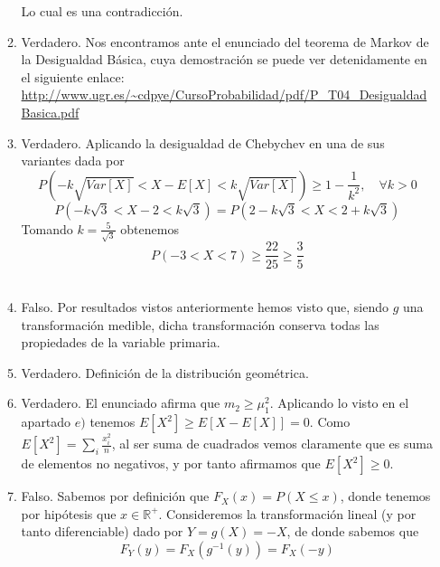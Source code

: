 \documentclass[fleqn]{article}
\def\R{\mathds{R}}
\begin{document}
\begin{enumerate}
\begin{enumerate}
                                        Lo cual es una contradicción.\\
                                \item Verdadero. Nos encontramos ante el enunciado del teorema de Markov de la Desigualdad Básica, cuya demostración
                                        se puede ver detenidamente en el siguiente enlace: \url{http://www.ugr.es/~cdpye/CursoProbabilidad/pdf/P_T04_DesigualdadBasica.pdf}\\
                                \item Verdadero. Aplicando la desigualdad de Chebychev en una de sus variantes dada por 
                                        $$P\left( - k\sqrt{Var[X]} < X - E[X] < k\sqrt{Var[X]}\right) \geq 1- \frac{1}{k^2}, \quad \forall k>0$$
                                        $$P\left( - k\sqrt{3} < X - 2 < k\sqrt{3}\right) = P\left( 2 - k\sqrt{3} < X < 2 + k\sqrt{3}\right)$$
                                        Tomando $k = \frac{5}{\sqrt{3}}$ obtenemos 
                                        $$P\left( - 3 < X < 7\right) \geq \frac{22}{25} \geq \frac{3}{5}$$\\
                                \item Falso. Por resultados vistos anteriormente hemos visto que, siendo $g$ una transformación medible, dicha transformación 
                                        conserva todas las propiedades de la variable primaria.\\
                                \item Verdadero. Definición de la distribución geométrica.\\
                                \item Verdadero. El enunciado afirma que $m_2 \geq \mu_1^2$. Aplicando lo visto en el apartado $e)$ tenemos $ E[X^2] \geq E[X- E[X]] = 0$.
                                        Como $E[X^2] = \sum_i \frac{x_i^2}{n}$, al ser suma de cuadrados vemos claramente que es suma de elementos no negativos,
                                        y por tanto afirmamos que $E[X^2] \geq 0$.\\
                                \item Falso. Sabemos por definición que $F_X (x) = P(X\leq x) $, donde tenemos por hipótesis que $x \in \R^+$. Consideremos la transformación lineal 
                                        (y por tanto diferenciable) dado por $Y = g(X) = -X$, de donde sabemos que 
                                        $$F_Y(y) = F_X(g^{-1}(y)) = F_X(-y)$$ 

\end{enumerate}
\end{enumerate}
\end{document}
